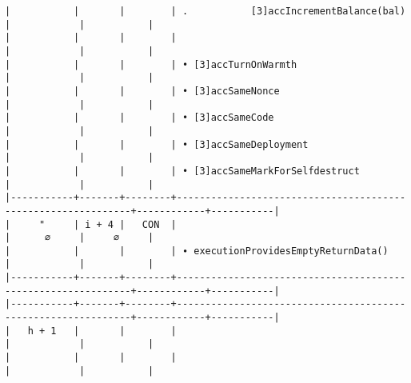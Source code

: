 \documentclass[varwidth=\maxdimen,margin=0.5cm,multi={verbatim}]{standalone}
\begin{document}
\begin{verbatim}
|           |       |        | .           [3]accIncrementBalance(bal)                      |            |           |
|           |       |        |                                                              |            |           |
|           |       |        | • [3]accTurnOnWarmth                                         |            |           |
|           |       |        | • [3]accSameNonce                                            |            |           |
|           |       |        | • [3]accSameCode                                             |            |           |
|           |       |        | • [3]accSameDeployment                                       |            |           |
|           |       |        | • [3]accSameMarkForSelfdestruct                              |            |           |
|-----------+-------+--------+--------------------------------------------------------------+------------+-----------|
|     "     | i + 4 |   CON  |                                                              |      ∅     |     ∅     |
|           |       |        | ∙ executionProvidesEmptyReturnData()                         |            |           |
|-----------+-------+--------+--------------------------------------------------------------+------------+-----------|
|-----------+-------+--------+--------------------------------------------------------------+------------+-----------|
|   h + 1   |       |        |                                                              |            |           |
|           |       |        |                                                              |            |           |
\end{verbatim}
\end{document}
